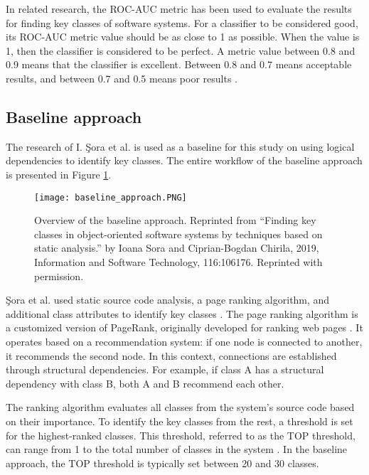In related research, the ROC-AUC metric has been used to evaluate the results for finding key classes of software systems. For a classifier to be considered good, its ROC-AUC metric value should be as close to 1 as possible.
When the value is 1, then the classifier is considered to be perfect. A metric value between 0.8 and 0.9 means that the classifier is excellent. Between 0.8 and 0.7 means acceptable results, and between 0.7 and 0.5 means poor results \cite{ROC_METRIC_VALS, b4}. 



\subsection{Baseline approach}
\label{subsec:key_previous_measurements}

\hspace{4em}The research of I. Şora et al. \cite{Finding-key-classes} is used as a baseline for this study on using logical dependencies to identify key classes. The entire workflow of the baseline approach is presented in Figure \ref{fig:baseline_approach}.

\begin{figure}[H]
\centering
\texttt{[image: baseline\_approach.PNG]}
\caption{Overview of the baseline approach. Reprinted from “Finding key classes in object-oriented
software systems by techniques based on static analysis.” by Ioana Sora and Ciprian-Bogdan Chirila, 2019, Information and Software Technology, 116:106176. Reprinted with permission. }
\label{fig:baseline_approach}
\centering
\end{figure}


Şora et al. used static source code analysis, a page ranking algorithm, and additional class attributes to identify key classes \cite{PagerankENASE, enase15, PagerankSACI, Finding-key-classes}. The page ranking algorithm is a customized version of PageRank, originally developed for ranking web pages \cite{ilprints422}. It operates based on a recommendation system: if one node is connected to another, it recommends the second node. In this context, connections are established through structural dependencies. For example, if class A has a structural dependency with class B, both A and B recommend each other.

The ranking algorithm evaluates all classes from the system’s source code based on their importance. To identify the key classes from the rest, a threshold is set for the highest-ranked classes. This threshold, referred to as the TOP threshold, can range from 1 to the total number of classes in the system \cite{b4}. In the baseline approach, the TOP threshold is typically set between 20 and 30 classes.


